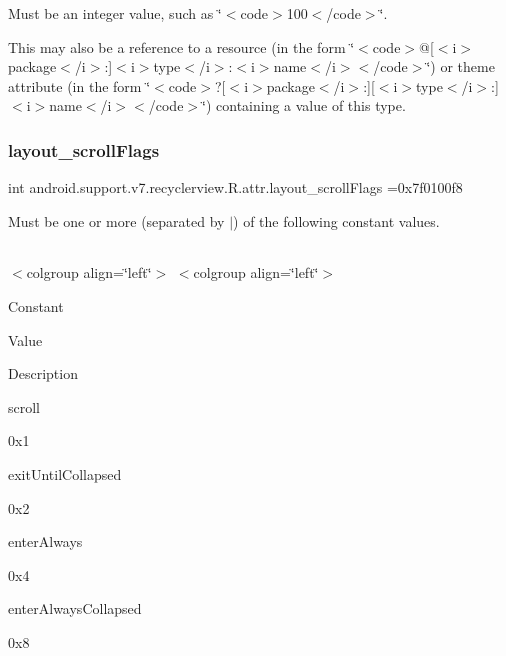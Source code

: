 Must be an integer value, such as \char`\"{}$<$code$>$100$<$/code$>$\char`\"{}. 

This may also be a reference to a resource (in the form \char`\"{}$<$code$>$@\mbox{[}$<$i$>$package$<$/i$>$\+:\mbox{]}$<$i$>$type$<$/i$>$\+:$<$i$>$name$<$/i$>$$<$/code$>$\char`\"{}) or theme attribute (in the form \char`\"{}$<$code$>$?\mbox{[}$<$i$>$package$<$/i$>$\+:\mbox{]}\mbox{[}$<$i$>$type$<$/i$>$\+:\mbox{]}$<$i$>$name$<$/i$>$$<$/code$>$\char`\"{}) containing a value of this type. \mbox{\label{classandroid_1_1support_1_1v7_1_1recyclerview_1_1R_1_1attr_a0d83cd5f5a760f225e9ef0ef75b56b7e}} 
\subsubsection{\texorpdfstring{layout\+\_\+scroll\+Flags}{layout\_scrollFlags}}
{\footnotesize\ttfamily int android.\+support.\+v7.\+recyclerview.\+R.\+attr.\+layout\+\_\+scroll\+Flags =0x7f0100f8\hspace{0.3cm}{\ttfamily [static]}}

Must be one or more (separated by \textquotesingle{}$\vert$\textquotesingle{}) of the following constant values.

\tabulinesep=1mm
\begin{longtabu} spread 0pt [c]{*{0}{|X[-1]}|}
\hline
\end{longtabu}
$<$colgroup align=\char`\"{}left\char`\"{}$>$ $<$colgroup align=\char`\"{}left\char`\"{}$>$ 

Constant

Value

Description 

{\ttfamily scroll}

0x1

{\ttfamily exit\+Until\+Collapsed}

0x2

{\ttfamily enter\+Always}

0x4

{\ttfamily enter\+Always\+Collapsed}

0x8

